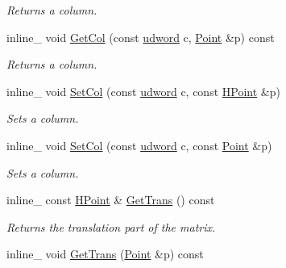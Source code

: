 \begin{DoxyCompactItemize}
\begin{DoxyCompactList}\small\item\em Returns a column. \end{DoxyCompactList}\item 
inline\+\_\+ void \hyperlink{classOpcode_1_1Matrix4x4_a136bdb46c6ab5632372cf73937af4597}{Get\+Col} (const \hyperlink{IceTypes_8h_a44c6f1920ba5551225fb534f9d1a1733}{udword} c, \hyperlink{classOpcode_1_1Point}{Point} \&p) const \hypertarget{classOpcode_1_1Matrix4x4_a136bdb46c6ab5632372cf73937af4597}{}\label{classOpcode_1_1Matrix4x4_a136bdb46c6ab5632372cf73937af4597}

\begin{DoxyCompactList}\small\item\em Returns a column. \end{DoxyCompactList}\item 
inline\+\_\+ void \hyperlink{classOpcode_1_1Matrix4x4_a83955aafea38439f5ebddd48ee8766fa}{Set\+Col} (const \hyperlink{IceTypes_8h_a44c6f1920ba5551225fb534f9d1a1733}{udword} c, const \hyperlink{classOpcode_1_1HPoint}{H\+Point} \&p)\hypertarget{classOpcode_1_1Matrix4x4_a83955aafea38439f5ebddd48ee8766fa}{}\label{classOpcode_1_1Matrix4x4_a83955aafea38439f5ebddd48ee8766fa}

\begin{DoxyCompactList}\small\item\em Sets a column. \end{DoxyCompactList}\item 
inline\+\_\+ void \hyperlink{classOpcode_1_1Matrix4x4_a1d0c01e2b05a5f80e64e39b1155e44e8}{Set\+Col} (const \hyperlink{IceTypes_8h_a44c6f1920ba5551225fb534f9d1a1733}{udword} c, const \hyperlink{classOpcode_1_1Point}{Point} \&p)\hypertarget{classOpcode_1_1Matrix4x4_a1d0c01e2b05a5f80e64e39b1155e44e8}{}\label{classOpcode_1_1Matrix4x4_a1d0c01e2b05a5f80e64e39b1155e44e8}

\begin{DoxyCompactList}\small\item\em Sets a column. \end{DoxyCompactList}\item 
inline\+\_\+ const \hyperlink{classOpcode_1_1HPoint}{H\+Point} \& \hyperlink{classOpcode_1_1Matrix4x4_a277b0a6367423ab4c02d83af7ec103b2}{Get\+Trans} () const \hypertarget{classOpcode_1_1Matrix4x4_a277b0a6367423ab4c02d83af7ec103b2}{}\label{classOpcode_1_1Matrix4x4_a277b0a6367423ab4c02d83af7ec103b2}

\begin{DoxyCompactList}\small\item\em Returns the translation part of the matrix. \end{DoxyCompactList}\item 
inline\+\_\+ void \hyperlink{classOpcode_1_1Matrix4x4_a828b7b4cbc9a4dfa7c67c8719a73ccde}{Get\+Trans} (\hyperlink{classOpcode_1_1Point}{Point} \&p) const \hypertarget{classOpcode_1_1Matrix4x4_a828b7b4cbc9a4dfa7c67c8719a73ccde}{}\label{classOpcode_1_1Matrix4x4_a828b7b4cbc9a4dfa7c67c8719a73ccde}


\end{DoxyCompactItemize}

